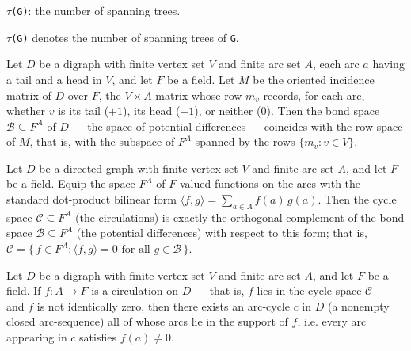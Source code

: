 \begin{definition}
\label{CycleSpace.tau}
\texttt{$\tau$(G)}: the number of spanning trees.

\texttt{$\tau$(G)} denotes the number of spanning trees of \texttt{G}.
\end{definition}

\begin{theorem}
\label{CycleSpace.bondSpace_eq_rowSpace}
\leanok
{}
Let $D$ be a digraph with finite vertex set $V$ and finite arc set $A$, each arc $a$
having a tail and a head in $V$, and let $F$ be a field. Let $M$ be the oriented
incidence matrix of $D$ over $F$, the $V \times A$ matrix whose row $m_v$ records, for
each arc, whether $v$ is its tail ($+1$), its head ($-1$), or neither ($0$). Then the
bond space $\mathcal{B} \subseteq F^{A}$ of $D$ — the space of potential differences —
coincides with the row space of $M$, that is, with the subspace of $F^{A}$ spanned by
the rows $\{m_v : v \in V\}$.
\end{theorem}

\begin{theorem}
\label{CycleSpace.cycleSpace_eq_orthogonal_bondSpace}
\leanok
{}
Let $D$ be a directed graph with finite vertex set $V$ and finite arc set $A$, and let
$F$ be a field. Equip the space $F^A$ of $F$-valued functions on the arcs with the
standard dot-product bilinear form $\langle f, g\rangle = \sum_{a \in A} f(a)\,g(a)$.
Then the cycle space $\mathcal{C} \subseteq F^A$ (the circulations) is exactly the
orthogonal complement of the bond space $\mathcal{B} \subseteq F^A$ (the potential
differences) with respect to this form; that is, $\mathcal{C} = \{\, f \in F^A : \langle
f, g\rangle = 0 \text{ for all } g \in \mathcal{B} \,\}$.
\end{theorem}

\begin{theorem}
\label{CycleSpace.exists_arcCycle_subset_support_of_isCirculation}
\leanok
{}
Let $D$ be a digraph with finite vertex set $V$ and finite arc set $A$, and let $F$ be a
field. If $f \colon A \to F$ is a circulation on $D$ — that is, $f$ lies in the cycle
space $\mathcal{C}$ — and $f$ is not identically zero, then there exists an arc-cycle
$c$ in $D$ (a nonempty closed arc-sequence) all of whose arcs lie in the support of $f$,
i.e. every arc appearing in $c$ satisfies $f(a) \neq 0$.
\end{theorem}

